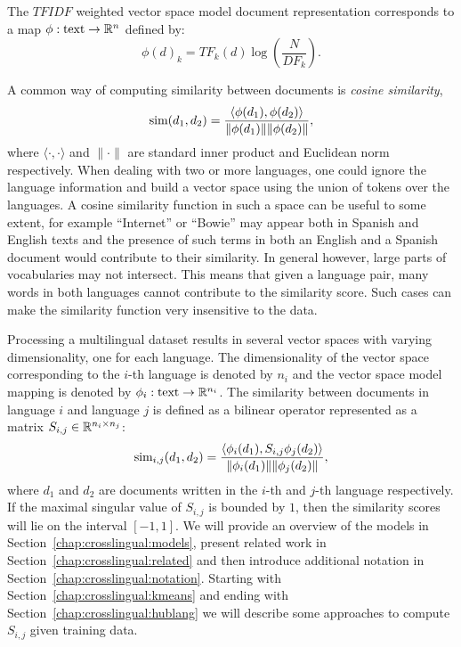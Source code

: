 The $TFIDF$ weighted vector space model document representation corresponds
to a map $\phi : \text{text} \rightarrow \mathbb{R}^n$ defined by:
$$\phi(d)_k = {TF}_k(d) \log\left( \frac{N}{{DF}_k}\right).$$

A common way of computing similarity between documents is \emph{cosine similarity},
$$\textnormal{sim}(d_1, d_2) = \frac{\langle \phi(d_1), \phi(d_2)\rangle}{\|\phi(d_1)\| \|\phi(d_2)\|},$$
where $\langle \cdot,\cdot \rangle$ and $\|\cdot\|$ are standard inner product and
Euclidean norm respectively. When dealing with two or more languages, one could ignore the language information
and build a vector space using the union of tokens over the languages. A cosine similarity
function in such a space can be useful to some extent, for example ``Internet'' or ``Bowie''
may appear both in Spanish and English texts and the presence of such terms in both an
English and a Spanish document would contribute to their similarity. In general however,
large parts of vocabularies may not intersect. This means that given a language pair,
many words in both languages cannot contribute to the similarity score. Such cases
can make the similarity function very insensitive to the data.

Processing a multilingual dataset results in several vector spaces with varying dimensionality,
one for each language. The dimensionality of the vector space corresponding to the $i$-th
language is denoted by $n_i$ and the vector space model mapping is denoted by
$\phi_i : \text{text} \rightarrow \mathbb{R}^{n_i}$.
The similarity between documents in language $i$ and language $j$ is defined as a bilinear
operator represented as a matrix $S_{i,j} \in \mathbb{R}^{n_i \times n_j}$:
$$\textnormal{sim}_{i,j}(d_1, d_2) = \frac{ \langle \phi_i (d_1), S_{i,j} \phi_j (d_2) \rangle }{\|\phi_i(d_1)\| \|\phi_j(d_2)\|},$$
where $d_1$ and $d_2$ are documents written in the $i$-th and $j$-th language respectively.
If the maximal singular value of $S_{i,j}$ is bounded by $1$, then the similarity scores
will lie on the interval $[-1, 1]$. We will provide an overview of the models in
Section~\ref{chap:crosslingual:models}, present related work in Section~\ref{chap:crosslingual:related} 
and then introduce additional notation in Section~\ref{chap:crosslingual:notation}.
Starting with Section~\ref{chap:crosslingual:kmeans} and ending with Section~\ref{chap:crosslingual:hublang} we will
describe some approaches to compute $S_{i,j}$ given training data.

